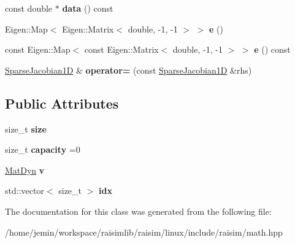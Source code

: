 \begin{DoxyCompactItemize}
const double $\ast$ {\bfseries data} () const
\item 
\mbox{\label{classraisim_1_1SparseJacobian1D_a62fa0028fbb203bc0aa70d38150f57df}} 
Eigen\+::\+Map$<$ Eigen\+::\+Matrix$<$ double, -\/1, -\/1 $>$ $>$ {\bfseries e} ()
\item 
\mbox{\label{classraisim_1_1SparseJacobian1D_aa20b97dbff69c4dfa4714394ba56c5fc}} 
const Eigen\+::\+Map$<$ const Eigen\+::\+Matrix$<$ double, -\/1, -\/1 $>$ $>$ {\bfseries e} () const
\item 
\mbox{\label{classraisim_1_1SparseJacobian1D_a6fa00d04f75772725beda893958a69ca}} 
\hyperlink{classraisim_1_1SparseJacobian1D}{Sparse\+Jacobian1D} \& {\bfseries operator=} (const \hyperlink{classraisim_1_1SparseJacobian1D}{Sparse\+Jacobian1D} \&rhs)
\end{DoxyCompactItemize}
\subsection*{Public Attributes}
\begin{DoxyCompactItemize}
\item 
\mbox{\label{classraisim_1_1SparseJacobian1D_af4fd0d2c8ee32d93ba180e347169b53b}} 
size\+\_\+t {\bfseries size}
\item 
\mbox{\label{classraisim_1_1SparseJacobian1D_ae9d8cfa121b93466407e4a3c12d69daa}} 
size\+\_\+t {\bfseries capacity} =0
\item 
\mbox{\label{classraisim_1_1SparseJacobian1D_a60c1a2e1e662784301f61a34f2a4f2fd}} 
\hyperlink{classraisim_1_1MatDyn}{Mat\+Dyn} {\bfseries v}
\item 
\mbox{\label{classraisim_1_1SparseJacobian1D_aaf0dd49dfc153878d73ea0caf18f17eb}} 
std\+::vector$<$ size\+\_\+t $>$ {\bfseries idx}
\end{DoxyCompactItemize}


The documentation for this class was generated from the following file\+:\begin{DoxyCompactItemize}
\item 
/home/jemin/workspace/raisimlib/raisim/linux/include/raisim/math.\+hpp\end{DoxyCompactItemize}
